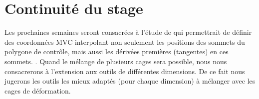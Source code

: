 \def\baselinestretch{1}
\chapter{Continuité du stage}
\ifpdf
\graphicspath{{Conclusions/ConclusionsFigs/PNG/}{Conclusions/ConclusionsFigs/PDF/}{Conclusions/ConclusionsFigs/}}
\else
\graphicspath{{Conclusions/ConclusionsFigs/EPS/}{Conclusions/ConclusionsFigs/}}
\fi


Les prochaines semaines seront consacrées à l'étude de \cite{LS08} qui
permettrait de définir des coordonnées MVC interpolant non seulement les
positions des sommets du polygone de contrôle, mais aussi les dérivées
premières (tangentes) en ces sommets. . Quand le mélange de plusieurs
cages sera possible, nous nous consacrerons à l'extension aux outils
de différentes dimensions. De ce fait nous jugerons les outils les
mieux adaptés (pour chaque dimension) à mélanger avec les cages de
déformation.



